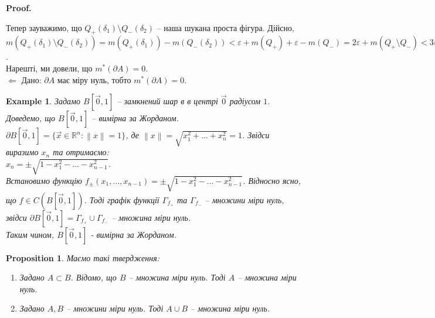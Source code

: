 \documentclass[a4paper, 10pt]{article}
\makeatletter
\def\qed{$\blacksquare$}
\def\leftproof{$\boxed{\Leftarrow}$ }
\theoremstyle{theoremdd}
\theoremstyle{theoremdd}
\theoremstyle{theoremdd}
\theoremstyle{theoremdd}
\theoremstyle{theoremdd}
\newtheorem{example}[theorem]{Example}
\theoremstyle{theoremdd}
\theoremstyle{theoremdd}
\theoremstyle{theoremdd}
\theoremstyle{theoremdd}
\newtheorem{proposition}[theorem]{Proposition}
\theoremstyle{theoremdd}
\theoremstyle{theoremdd}
\theoremstyle{theoremdd}
\theoremstyle{theoremdd}
\theoremstyle{theoremdd}
\theoremstyle{theoremdd}
\renewenvironment{proof}[1][Proof.\\]{\par
\pushQED{\hfill \qed}%
\normalfont \topsep6\p@\@plus6\p@\relax
\trivlist
\item\relax
{\bfseries
#1\@addpunct{.}}\hspace\labelsep\ignorespaces
}{%
\popQED\endtrivlist\@endpefalse
}
\newcommand\Norm[1]{\left\lVert#1\right\rVert}
\makeatother
\begin{document}
\begin{proof}
Тепер зауважимо, що $Q_+(\delta_1) \setminus Q_-(\delta_2)$ -- наша шукана проста фігура. Дійсно,\\
$m(Q_+(\delta_1) \setminus Q_-(\delta_2)) = m(Q_+(\delta_1)) - m(Q_-(\delta_2)) < \varepsilon + m(Q_+) + \varepsilon - m(Q_-) = 2 \varepsilon + m(Q_+ \setminus Q_-) < 3 \varepsilon$.\\
Нарешті, ми довели, що $m^*(\partial A) = 0$.
\bigskip \\
\leftproof Дано: $\partial A$ має міру нуль, тобто $m^*(\partial A) = 0$.
\iffalse
Розглянемо множину $Q_+^n = \displaystyle\bigsqcup_i P_i^n$, де кожний $P_i^n$ був побудований із $P_i$ шляхом зменшення лівого кінця та збільшення правого кінця на $\dfrac{1}{n}$ (тобто було $[a,b)$ та стало $\left[a-\dfrac{1}{n},b+\dfrac{1}{n}\right)$). Зауважимо, що $m(Q_+^n) \to m(Q_+)$ при $n \to \infty$. Тобто знайдеться номер $N$ так, що $m(Q_+^N) - m(Q_+) < \varepsilon$.
\fi
\end{proof}

\begin{example}
Задамо $B[\vec{0},1]$ -- замкнений шар в в центрі $\vec{0}$ радіусом $1$. Доведемо, що $B[\vec{0},1]$ -- вимірна за Жорданом.\\
$\partial B[\vec{0},1] = \{ \vec{x} \in \mathbb{R}^n: \Norm{x} = 1 \}$, де $\Norm{x} = \sqrt{x_1^2+\dots+x_n^2} = 1$. Звідси виразимо $x_n$ та отримаємо:\\
$x_n = \pm \sqrt{1-x_1^2-\dots-x_{n-1}^2}$.\\
Встановимо функцію $f_{\pm}(x_1,\dots,x_{n-1}) = \pm \sqrt{1-x_1^2-\dots-x_{n-1}^2}$. Відносно ясно, що $f \in C(B[\vec{0},1])$. Тоді графік функції $\Gamma_{f_+}$ та $\Gamma_{f_-}$ -- множини міри нуль, звідси $\partial B[\vec{0},1] = \Gamma_{f_+} \cup \Gamma_{f_-}$ -- множина міри нуль.\\
Таким чином, $B[\vec{0},1]$ - вимірна за Жорданом.
\end{example}

\begin{proposition} Маємо такі твердження:
\begin{enumerate}[nosep,wide=0pt,label={\arabic*)}]
\item Задано $A \subset B$. Відомо, що $B$ -- множина міри нуль. Тоді $A$ -- множина міри нуль.
\item Задано $A,B$ -- множини міри нуль. Тоді $A \cup B$ -- множина міри нуль.
\end{enumerate}
\end{proposition}
\end{document}
